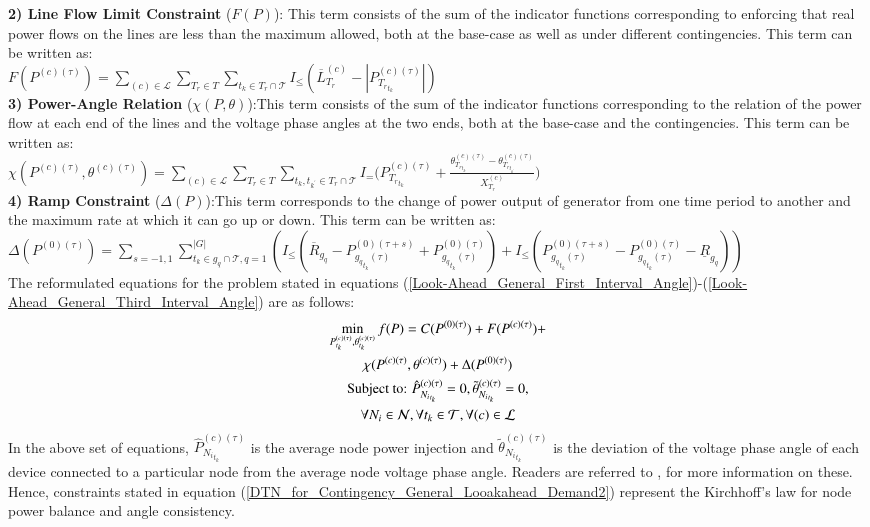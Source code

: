 \documentclass[preprint,12pt,3p]{elsarticle}
\begin{document}
\textbf{2) Line Flow Limit Constraint} ($F(P)$): This term consists of the sum of the indicator functions corresponding to enforcing that real power flows on the lines are less than the maximum allowed, both at the base-case as well as under different contingencies. This term can be written as:\\
$F(P^{(c)(\tau)})=\sum_{(c)\in\mathcal{L}}\sum_{T_r\in T}\sum_{t_k\in T_r\cap{\mathcal{T}}}I_{\leq}({\overline{L}}_{T_r}^{(c)}-|{P}_{{T_r}_{t_k}}^{(c)(\tau)}|)$\\
\textbf{3) Power-Angle Relation} ($\chi(P,\theta)$):This term consists of the sum of the indicator functions corresponding to the relation of the power flow at each end of the lines and the voltage phase angles at the two ends, both at the base-case and the contingencies. This term can be written as:\\
$\chi(P^{(c)(\tau)},\theta^{(c)(\tau)})=\sum_{(c)\in\mathcal{L}}\sum_{T_r\in T}\sum_{t_k,t_{k^{'}}\in T_r\cap{\mathcal{T}}}I_{=}\Bigg({P}_{{T_r}_{t_k}}^{(c)(\tau)}+\frac{{\theta}_{{T_r}_{t_k}}^{(c)(\tau)}-{\theta}_{{T_r}_{t_{k^{'}}}}^{(c)(\tau)}}{{X}_{T_r}^{(c)}}\Bigg)$\\
\textbf{4) Ramp Constraint} ($\Delta(P)$):This term corresponds to the change of power output of generator from one time period to another and the maximum rate at which it can go up or down. This term can be written as:\\
$\Delta(P^{(0)(\tau)})=\sum_{s=-1,1}\sum_{t_k\in g_q\cap{\mathcal{T}}, q=1}^{|G|}(I_{\leq}(\overline{R}_{g_q}-P_{{g_q}_{t_k}(\tau)}^{(0)(\tau+s)}+P_{{g_q}_{t_k}(\tau)}^{(0)(\tau)})+I_{\leq}(P_{{g_q}_{t_k}(\tau)}^{(0)(\tau+s)}-P_{{g_q}_{t_k}(\tau)}^{(0)(\tau)}-\underline{R}_{g_q}))$\\
The reformulated equations for the problem stated in equations (\ref{Look-Ahead_General_First_Interval_Angle})-(\ref{Look-Ahead_General_Third_Interval_Angle}) are as follows:
\begin{subequations}\label{DTN_for_Contingency_General_Looakahead_Demand}
\begin{gather}
\min_{P_{t_k}^{(c)(\tau)}, \theta_{t_k}^{(c)(\tau)}}f(P)=C(P^{(0)(\tau)})
+F(P^{(c)(\tau)})+\notag\\\chi(P^{(c)(\tau)},\theta^{(c)(\tau)})
+\Delta(P^{(0)(\tau)})\label{DTN_for_Contingency_General_Looakahead_Demand1}\\
\text{Subject to: }\hat{P}_{{N_i}_{t_k}}^{(c)(\tau)}=0, \tilde{\theta}_{{N_i}_{t_k}}^{(c)(\tau)}=0,\notag\\\forall N_i\in\mathcal{N}, \forall t_k\in\mathcal{T}, \forall (c)\in\mathcal{L}\label{DTN_for_Contingency_General_Looakahead_Demand2}
\end{gather}
\end{subequations}
In the above set of equations, $\hat{P}_{{N_i}_{t_k}}^{(c)(\tau)}$ is the average node power injection and $\tilde{\theta}_{{N_i}_{t_k}}^{(c)(\tau)}$ is the deviation of the voltage phase angle of each device connected to a particular node from the average node voltage phase angle. Readers are referred to \cite{CK:14}, \cite{KC:13} for more information on these. Hence, constraints stated in equation (\ref{DTN_for_Contingency_General_Looakahead_Demand2}) represent the Kirchhoff's law for node power balance and angle consistency.
\end{document}
